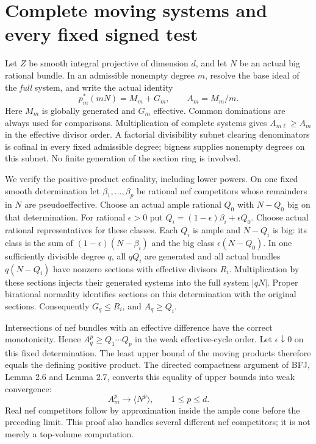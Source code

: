 \documentclass[10pt]{article}
\begin{document}
\section{Complete moving systems and every fixed signed test}
Let $Z$ be smooth integral projective of dimension $d$, and let $N$ be an
actual big rational bundle. In an admissible nonempty degree $m$, resolve
the base ideal of the \emph{full} system, and write the actual identity
\[
 p_m^*(mN)=M_m+G_m,\qquad A_m=M_m/m.                 \tag{7.1}
\]
Here $M_m$ is globally generated and $G_m$ effective. Common dominations
are always used for comparisons. Multiplication of complete systems gives
$A_{m\ell}\geq A_m$ in the effective divisor order. A factorial divisibility
subnet clearing denominators is cofinal in every fixed admissible degree;
bigness supplies nonempty degrees on this subnet. No finite generation of
the section ring is involved.

We verify the positive-product cofinality, including lower powers. On one
fixed smooth determination let $\beta_1,\ldots,\beta_p$ be rational nef
competitors whose remainders in $N$ are pseudoeffective. Choose an actual
ample rational $Q_0$ with $N-Q_0$ big on that determination. For rational
$\epsilon>0$ put $Q_i=(1-\epsilon)\beta_i+\epsilon Q_0$. Choose actual
rational representatives for these classes. Each $Q_i$ is ample and
$N-Q_i$ is big: its class is the sum of $(1-\epsilon)(N-\beta_i)$ and the
big class $\epsilon(N-Q_0)$. In one sufficiently divisible degree $q$,
all $qQ_i$ are generated and all actual bundles $q(N-Q_i)$ have nonzero
sections with effective divisors $R_i$. Multiplication by these sections
injects their generated systems into the full system $|qN|$. Proper
birational normality identifies sections on this determination with the
original sections. Consequently $G_q\leq R_i$, and $A_q\geq Q_i$.

Intersections of nef bundles with an effective difference have the correct
monotonicity. Hence $A_q^p\geq Q_1\cdots Q_p$ in the weak effective-cycle
order. Let $\epsilon\downarrow0$ on this fixed determination. The least
upper bound of the moving products therefore equals the defining positive
product. The directed compactness argument of BFJ, Lemma 2.6 and Lemma 2.7,
converts this equality of upper bounds into weak convergence:
\[
 A_m^p\longrightarrow\langle N^p\rangle,
                 \qquad 1\leq p\leq d.             \tag{7.2}
\]
Real nef competitors follow by approximation inside the ample cone before
the preceding limit. This proof also handles several different nef
competitors; it is not merely a top-volume computation.
\end{document}
